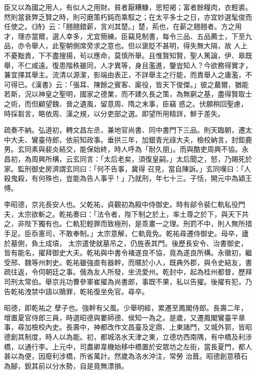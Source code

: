 \begin{pinyinscope}
 臣又以為國之用人，有似人之用財。貧者厭糟糠，思短褐；富者餘糧肉，衣輕裘。然則當衰弊乏賢之時，則可磨策朽鈍而乘馭之；在太平多士之日，亦宜妙選髦俊而任使之。《詩》云：「翹翹錯薪，言刈其楚。」楚，荊也，在薪之翹翹者。方之用才，理亦當爾，選人幸多，尤宜簡練。臣竊見制書，每令三品、五品薦士，下至九品，亦令舉人，此聖朝側席旁求之意也。但以褒貶不甚明，得失無大隔，故
 人上不憂黜責，下不盡搜揚，茍以應命，莫慎所舉。且惟賢知賢，聖人篤論，伊、皋既舉，不仁咸遠。復患階秩雖同，人才異等，身且濫進，鑒豈知人？今欲務得實才，兼宜擇其舉主。流清以源潔，影端由表正，不詳舉主之行能，而責舉人之庸濫，不可得已。《漢書》云：「張耳、陳餘之賓客、廝役，皆天下俊傑。」彼之蕞爾，猶能若斯，況以神皇之聖明，國家之德業，而不建久長之策，為無窮之基，盡得賢取士之術，而但顧望魏、晉之遺風，留意周、隋之末事，臣竊
 惑之。伏願稍回聖慮，時採芻言，略依周、漢之規，以分吏部之選。即望所用精詳，鮮于差失。



 疏奏不納。弘道初，轉文昌左丞，兼地官尚書、同中書門下三品。則天臨朝，遷太中大夫、鸞臺侍郎，依前知政事。垂拱三年，加銀青光祿大夫，檢校納言，封鉅鹿男。玄同素與裴炎結交，能保始終，時人呼為「耐久朋」。而與酷吏周興不協。永昌初，為周興所構，云玄同言：「太后老矣，須復皇嗣。」太后聞之，怒，乃賜死於家。監刑御史房濟謂玄同曰：「何不告事，冀得
 召見，當自陳訴。」玄同嘆曰：「人殺鬼殺，有何殊也，豈能為告人事乎！」乃就刑，年七十三。子恬，開元中為潁王傅。



 李昭德，京兆長安人也。父乾祐，貞觀初為殿中侍御史。時有鄃令裴仁軌私役門夫，太宗欲斬之。乾祐奏曰：「法令者，陛下制之於上，率土尊之於下，與天下共之，非陛下獨有也。仁軌犯輕罪而致極刑，是乖畫一之理。刑罰不中，則人無所措手足。臣忝憲司，不敢奉制。」太宗意解，仁軌竟免。乾祐尋遷侍御史。母卒，廬於墓側，負土成墳，
 太宗遣使就墓吊之，仍旌表其門。後歷長安令、治書御史，皆有能名，擢拜御史大夫。乾祐與中書令褚遂良不協，竟為遂良所構。永徽初，繼受邢、魏等州刺史。乾祐雖強直有器幹，而暱於小人，既典外郡，與令史結友，書疏往返，令伺朝廷之事。俄為友人所發，坐流愛州。乾封中，起為桂州都督，歷拜司刑太常伯。舉京兆功曹參軍崔擢為尚書郎，事既不果，私以告擢。後擢有犯，乃告乾祐洩禁中語以贖罪，乾祐復坐免官。尋卒。



 昭德，即乾祐之
 孽子也。強幹有父風。少舉明經，累遷至鳳閣侍郎。長壽二年，增置夏官侍郎三員，時選昭德與婁師德、侯知一為之。是歲，又遷鳳閣鸞臺平章事，尋加檢校內史。長壽中，神都改作文昌臺及定鼎、上東諸門，又城外郭，皆昭德創其制度，時人以為能。初，都城洛水天津之東，立德坊西南隅，有中橋及利涉橋，以通行李。上元中，司農卿韋機始移中橋置於安眾坊之左街，當長夏門，都人甚以為便，因廢利涉橋，所省萬計。然歲為洛水沖注，常勞
 治葺。昭德創意積石為腳，銳其前以分水勢，自是竟無漂損。




\end{pinyinscope}
